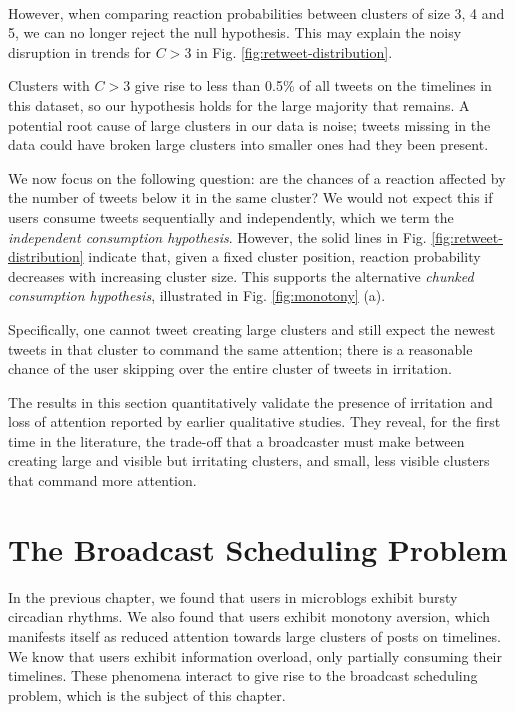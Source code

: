 \documentclass[onesided,asymmetric]{tufte-book}
\begin{document}
\\[2.5pc]
However, when comparing reaction probabilities between clusters of size 3, 4 and 5, we can no longer reject the null hypothesis. This may explain the noisy disruption in trends for $C > 3$ in Fig. \ref{fig:retweet-distribution}.

Clusters with $C > 3$ give rise to less than 0.5\% of all tweets on the timelines in this dataset, so our hypothesis holds for the large majority that remains. A potential root cause of large clusters in our data is noise; tweets missing in the data could have broken large clusters into smaller ones had they been present.

We now focus on the following question: are the chances of a reaction affected by the number of tweets below it in the same cluster? We would not expect this if users consume tweets sequentially and independently, which we term the \textit{independent consumption hypothesis}. However, the solid lines in Fig. \ref{fig:retweet-distribution} indicate that, given a fixed cluster position, reaction probability decreases with increasing cluster size. This supports the alternative \textit{chunked consumption hypothesis}, illustrated in Fig. \ref{fig:monotony} (a).

Specifically, one cannot tweet creating large clusters and still expect the newest tweets in that cluster to command the same attention; there is a reasonable chance of the user skipping over the entire cluster of tweets in irritation.

The results in this section quantitatively validate the presence of irritation and loss of attention reported by earlier qualitative studies. They reveal, for the first time in the literature, the trade-off that a broadcaster must make between creating large and visible but irritating clusters, and small, less visible clusters that command more attention.

\chapter{The Broadcast Scheduling Problem}
\label{ch:problem}

In the previous chapter, we found that users in microblogs exhibit bursty circadian rhythms. We also found that users exhibit monotony aversion, which manifests itself as reduced attention towards large clusters of posts on timelines. We know that users exhibit information overload, only partially consuming their timelines. These phenomena interact to give rise to the broadcast scheduling problem, which is the subject of this chapter.
\end{document}
